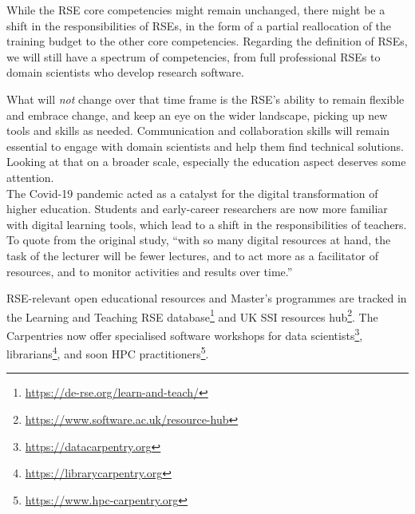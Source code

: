 \documentclass{eceasst}
\begin{document}
While the RSE core competencies\cite{Goth2024} might remain unchanged,
there might be a shift in the responsibilities of RSEs,
in the form of a partial reallocation of the training budget
to the other core competencies.
Regarding the definition of RSEs, we will still have a spectrum of competencies,
from full professional RSEs to domain scientists who develop research software.

What will \emph{not} change over that time frame is the RSE's ability to remain
flexible and embrace change, and keep an eye on the wider landscape,
picking up new tools and skills as needed.
Communication and collaboration skills will remain essential to engage
with domain scientists and help them find technical solutions.\\

Looking at that on a broader scale, especially the education aspect deserves some attention.\\
The Covid-19 pandemic acted as a catalyst for the digital transformation
of higher education\cite{Bygstad2022}. Students and early-career researchers
are now more familiar with digital learning tools, which lead to a shift
in the responsibilities of teachers. To quote from the original study,
``with so many digital resources at hand,
the task of the lecturer will be fewer lectures,
and to act more as a facilitator of resources,
and to monitor activities and results over time.''\cite{Bygstad2022}

RSE-relevant open educational resources and Master's programmes are tracked
in the Learning and Teaching RSE database\footnote{\url{https://de-rse.org/learn-and-teach/}}
and UK SSI resources hub\footnote{\url{https://www.software.ac.uk/resource-hub}}.
The Carpentries now offer specialised software workshops
for data scientists\footnote{\url{https://datacarpentry.org}},
librarians\footnote{\url{https://librarycarpentry.org}},
and soon HPC practitioners\footnote{\url{https://www.hpc-carpentry.org}}.
\end{document}
